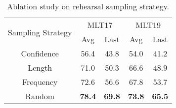 \documentclass[10pt,twocolumn,letterpaper]{article}
\begin{document}
\begin{table}[]
\begin{center}
\begin{tabular}{c|cc|cc}
\hline
\multirow{2}{*}{Sampling Strategy} & \multicolumn{2}{c|}{MLT17}    & \multicolumn{2}{c}{MLT19}     \\ \cline{2-5} 
                                  & Avg           & Last          & Avg           & Last          \\ \hline
Confidence                           & 56.4          & 43.8          & 54.0          & 41.2          \\
Length                              & 71.0          & 50.3          & 66.6          & 48.9          \\Frequency                          & 72.6          & 56.6          & 67.8          & 53.7          \\ \hline
Random                             & \textbf{78.4} & \textbf{69.8} & \textbf{73.8} & \textbf{65.5} \\ \hline
\end{tabular}
\end{center}
\caption{Ablation study on rehearsal sampling strategy.}
\label{table:sampling}
\end{table}
\end{document}
